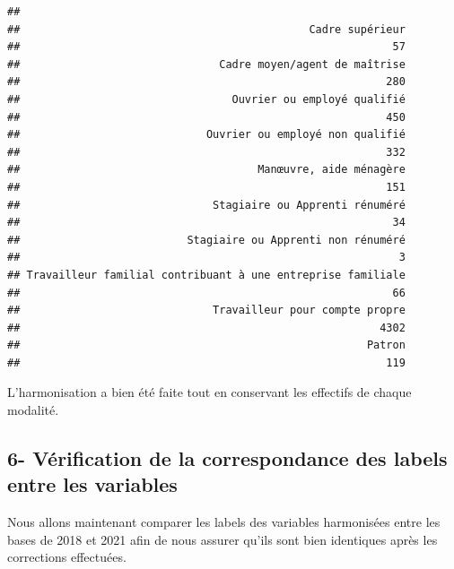 \documentclass[
]{article}
\begin{document}
\begin{verbatim}
## 
##                                             Cadre supérieur 
##                                                          57 
##                               Cadre moyen/agent de maîtrise 
##                                                         280 
##                                 Ouvrier ou employé qualifié 
##                                                         450 
##                             Ouvrier ou employé non qualifié 
##                                                         332 
##                                     Manœuvre, aide ménagère 
##                                                         151 
##                              Stagiaire ou Apprenti rénuméré 
##                                                          34 
##                          Stagiaire ou Apprenti non rénuméré 
##                                                           3 
## Travailleur familial contribuant à une entreprise familiale 
##                                                          66 
##                              Travailleur pour compte propre 
##                                                        4302 
##                                                      Patron 
##                                                         119
\end{verbatim}

L'harmonisation a bien été faite tout en conservant les effectifs de
chaque modalité.

\hypertarget{vuxe9rification-de-la-correspondance-des-labels-entre-les-variables}{%
\subsection{6- Vérification de la correspondance des labels entre les
variables}\label{vuxe9rification-de-la-correspondance-des-labels-entre-les-variables}}

Nous allons maintenant comparer les labels des variables harmonisées
entre les bases de 2018 et 2021 afin de nous assurer qu'ils sont bien
identiques après les corrections effectuées.
\end{document}
